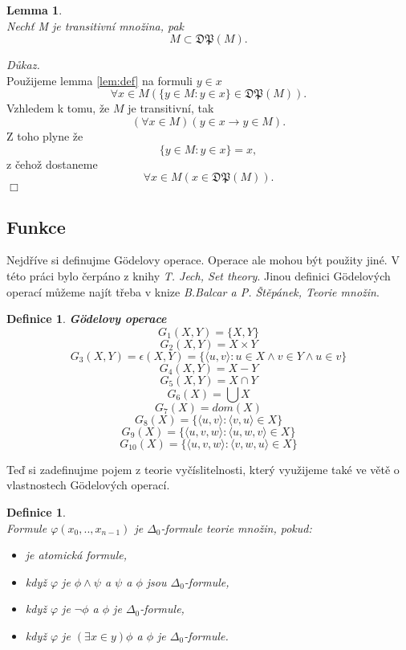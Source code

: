 \documentclass[12pt,a4paper]{article}
\newtheorem{lemma}[veta]{Lemma}
\newtheorem{definice}[veta]{Definice}
\newenvironment{proof}
{\noindent \textit{D\r{u}kaz.}}
{\hspace*{\fill} $\Box$}
\begin{document}
\begin{lemma}
~\\
\label{lem:sub}
Nech\v{t} M  je transitivn\'{i} mno\v{z}ina, pak \[  M \subset \mathfrak{DP}(M).  \]
\end{lemma}
\begin{proof}
~\\
Pou\v{z}ijeme lemma \ref{lem:def} na formuli $ y \in x  $
\[ \forall x \in M (\{y \in M:y \in x\} \in \mathfrak{DP}(M)) .\]
Vzhledem k tomu, \v{z}e $ M $  je transitivn\'{i}, tak 
\[ (\forall x \in M)(y \in x \rightarrow y \in M) .\]
Z toho plyne \v{z}e 
\[ \{y \in M:y \in x\}=x ,\]
z \v{c}eho\v{z} dostaneme
\[ \forall x \in M (x \in \mathfrak{DP}(M)) .\]
\end{proof}

\newpage
\subsection{Funkce}
Nejd\v{r}\'{i}ve si definujme G\"{o}delovy operace. Operace ale mohou b\'{y}t pou\v{z}ity jin\'{e}.  V t\'{e}to pr\'{a}ci bylo \v{c}erp\'{a}no  z knihy \textit{T. Jech, Set theory}. Jinou definici  G\"{o}delov\'{y}ch operac\'{i} m\r{u}\v{z}eme naj\'{i}t t\v{r}eba v knize \textit{B.Balcar a P. \v{S}t\v{e}p\'{a}nek, Teorie mno\v{z}in}.
\begin{definice}
\textbf{G\"{o}delovy operace \\}
\label{def:operace}
\[ G_1(X,Y)=\{X,Y\}  \]
\[ G_2(X,Y)= X \times  Y   \]
\[ G_3(X,Y)=\epsilon(X,Y)=\{\langle u,v\rangle: u \in X \wedge  v \in Y \wedge  u \in v \}  \] 
\[ G_4(X,Y)= X -  Y \] 
\[ G_5(X,Y)= X \cap  Y  \] 
\[  G_6(X)= \bigcup X \] 
\[ G_7(X)= dom(X)  \]
\[ G_8(X)= \{\langle u,v \rangle: \langle v,u \rangle \in X \}  \]
\[ G_9(X)= \{\langle u,v,w \rangle: \langle u,w,v \rangle \in X \}  \]
\[  G_{10}(X)= \{ \langle u,v,w \rangle: \langle v,w,u \rangle \in X \}  \]
\end{definice}
Te\v{d} si zadefinujme pojem z teorie vy\v{c}\'{i}slitelnosti, kter\'{y} vyu\v{z}ijeme tak\'{e} ve v\v{e}t\v{e} o vlastnostech  G\"{o}delov\'{y}ch operac\'{i}.
\begin{definice}~\\
Formule $\varphi(x_0,..,x_{n-1})$ je $\Delta_0$-formule teorie mno\v{z}in, pokud:
\begin{itemize}
  \item je atomick\'{a} formule,
  \item kdy\v{z} $\varphi$ je $\phi \wedge \psi $ a $\psi$ a $\phi$ jsou $\Delta_0$-formule,
  \item kdy\v{z} $\varphi$ je $\neg \phi $ a $\phi$ je $\Delta_0$-formule,
  \item kdy\v{z} $\varphi$ je $(\exists x \in y) \phi$ a $\phi$ je $\Delta_0$-formule.
\end{itemize}
\end{definice}
\end{document}
